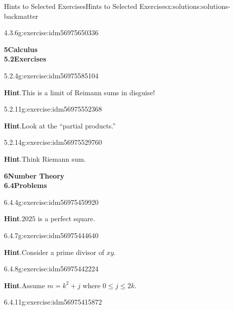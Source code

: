 \documentclass[twoside,10pt,]{book}
\newcommand{\blocktitlefont}{\relax}
\numberwithin{equation}{section}
\begin{document}
\begin{solutions-chapter}{Hints  to Selected Exercises}{}{Hints  to Selected Exercises}{}{}{x:solutions:solutions-backmatter}
\begin{divisionsolution}{4.3.6}{}{g:exercise:idm56975650336}
\end{divisionsolution}%
\par\medskip
\noindent\textbf{\Large{}5\space\textperiodcentered\space{}Calculus\\
5.2\space\textperiodcentered\space{}Exercises}
\begin{divisionsolution}{5.2.4}{}{g:exercise:idm56975585104}%
\par\smallskip%
\noindent\textbf{\blocktitlefont Hint}.\hypertarget{g:hint:idm56975578816-back}{}\quad{}This is a limit of Reimann sums in disguise!%
\end{divisionsolution}%
\begin{divisionsolution}{5.2.11}{}{g:exercise:idm56975552368}%
\par\smallskip%
\noindent\textbf{\blocktitlefont Hint}.\hypertarget{g:hint:idm56975548304-back}{}\quad{}Look at the ``partial products.''%
\end{divisionsolution}%
\begin{divisionsolution}{5.2.14}{}{g:exercise:idm56975529760}%
\par\smallskip%
\noindent\textbf{\blocktitlefont Hint}.\hypertarget{g:hint:idm56975525664-back}{}\quad{}Think Riemann sum.%
\end{divisionsolution}%
\par\medskip
\noindent\textbf{\Large{}6\space\textperiodcentered\space{}Number Theory\\
6.4\space\textperiodcentered\space{}Problems}
\begin{divisionsolution}{6.4.4}{}{g:exercise:idm56975459920}%
\par\smallskip%
\noindent\textbf{\blocktitlefont Hint}.\hypertarget{g:hint:idm56975458576-back}{}\quad{}\(2025\) is a perfect square.%
\end{divisionsolution}%
\begin{divisionsolution}{6.4.7}{}{g:exercise:idm56975444640}%
\par\smallskip%
\noindent\textbf{\blocktitlefont Hint}.\hypertarget{g:hint:idm56975443072-back}{}\quad{}Consider a prime divisor of \(x y\).%
\end{divisionsolution}%
\begin{divisionsolution}{6.4.8}{}{g:exercise:idm56975442224}%
\par\smallskip%
\noindent\textbf{\blocktitlefont Hint}.\hypertarget{g:hint:idm56975439840-back}{}\quad{}Assume \(m = k^2 + j\) where \(0 \leq j \leq 2k\).%
\end{divisionsolution}%
\begin{divisionsolution}{6.4.11}{}{g:exercise:idm56975415872}%

\end{divisionsolution}
\end{solutions-chapter}
\end{document}
